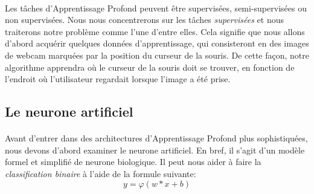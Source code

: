 \paragraph{}
Les tâches d'Apprentissage Profond peuvent être supervisées, semi-supervisées ou non supervisées.
Nous nous concentrerons sur les tâches \emph{supervisées} et nous traiterons notre problème comme l'une d'entre elles.
Cela signifie que nous allons d'abord acquérir quelques données d'apprentissage, qui consisteront en des images de webcam marquées par la position du curseur de la souris.
De cette façon, notre algorithme apprendra où le curseur de la souris doit se trouver, en fonction de l'endroit où l'utilisateur regardait lorsque l'image a été prise.

\subsection{Le neurone artificiel}
\paragraph{}
Avant d'entrer dans des architectures d'Apprentissage Profond plus sophistiquées, nous devons d'abord examiner le neurone artificiel.
En bref, il s'agit d'un modèle formel et simplifié de neurone biologique.
Il peut nous aider à faire la \emph{classification binaire} à l'aide de la formule suivante:
$$
y = \varphi (w * x + b)
$$

